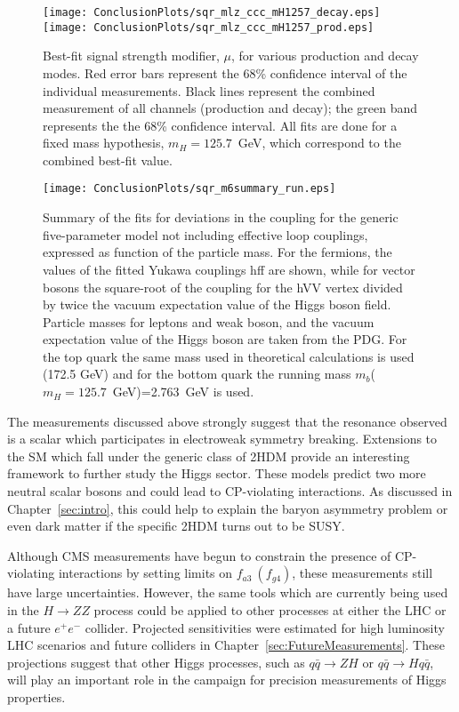 \begin{figure}
\begin{center}
\texttt{[image: ConclusionPlots/sqr\_mlz\_ccc\_mH1257\_decay.eps]}
\texttt{[image: ConclusionPlots/sqr\_mlz\_ccc\_mH1257\_prod.eps]}
\caption{Best-fit signal strength modifier, $\mu$, for various 
production and decay modes.  Red error bars represent the 68\%
confidence interval of the individual measurements.  Black lines
represent the combined measurement of all channels (production and
decay); the green band represents the the 68\% confidence interval.
All fits are done for a fixed mass hypothesis, $m_H=125.7$~GeV, 
which correspond to the combined best-fit value.}
\label{fig:crossSectionsByChannel}
\end{center}
\end{figure}

\begin{figure}
\begin{center}
\texttt{[image: ConclusionPlots/sqr\_m6summary\_run.eps]}
\caption{Summary of the fits for deviations in the coupling for the generic five-parameter model not including effective loop couplings, expressed as function of the particle mass. For the fermions, the values of the fitted Yukawa couplings hff are shown, while for vector bosons the square-root of the coupling for the hVV vertex divided by twice the vacuum expectation value of the Higgs boson field. Particle masses for leptons and weak boson, and the vacuum expectation value of the Higgs boson are taken from the PDG. For the top quark the same mass used in theoretical calculations is used (172.5 GeV) and for the bottom quark the running mass $m_b$($m_H=125.7$~GeV)=2.763~GeV is used.}
\label{fig:couplingMeasurements}
\end{center}
\end{figure}

The measurements discussed above strongly suggest that the 
resonance observed is a scalar which participates in
electroweak symmetry breaking.  Extensions to the SM which 
fall under the generic class of 2HDM provide an interesting
framework to further study the Higgs sector.  These models
predict two more neutral scalar bosons and could lead to 
CP-violating interactions.  As discussed in Chapter~\ref{sec:intro},
this could help to explain the baryon asymmetry problem
or even dark matter if the specific 2HDM turns out
to be SUSY.

Although CMS measurements have begun to constrain the presence
of CP-violating interactions by setting limits on $f_{a3}~(f_{g4})$, 
these measurements still have large uncertainties.  However, 
the same tools which are currently being used in the $H\to ZZ$ 
process could be applied to other processes at either the LHC or a
future $e^+e^-$ collider.    Projected sensitivities were
estimated for high luminosity LHC scenarios
and future colliders in Chapter~\ref{sec:FutureMeasurements}.
These projections suggest that other Higgs processes, such as 
$q\bar{q}\to ZH$ or $q\bar{q}\to Hq\bar{q}$, will play 
an important role in the campaign for precision measurements
of Higgs properties.   

